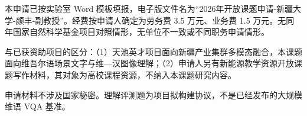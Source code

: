 \justifying
\NSFCBodyText

本申请已按实验室 Word 模板填报，电子版文件名为“2026年开放课题申请-新疆大学-颜丰-副教授”。经费按申请人确定为劳务费 3.5 万元、业务费 1.5 万元。无同年国家自然科学基金项目对照情形，无单位不一致或不同职务申请情形。

与已获资助项目的区分：（1）天池英才项目面向新疆产业集群多模态融合，本课题面向维吾尔语场景文字与维—汉图像理解；（2）申请人另有新能源教学资源开放课题写作材料，其对象为高校课程资源，不纳入本课题研究内容。

申请材料不涉及国家秘密。理解评测题为项目拟构建协议，不是已经发布的大规模维语 VQA 基准。
